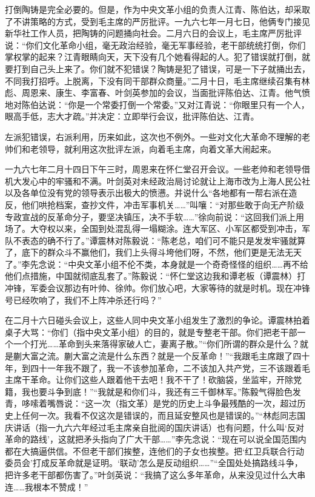 \begin{maonote}
打倒陶铸是完全必要的。但是，作为中央文革小组的负责人江青、陈伯达，却采取了不讲策略的方式，受到毛主席的严厉批评。一九六七年一月七日，他俩专门接见新华社工作人员，把陶铸的问题捅向社会。二月六日的会议上，毛主席严厉批评说：“你们文化革命小组，毫无政治经验，毫无军事经验，老干部统统打倒，你们掌权掌的起来？江青眼睛向天，天下没有几个她看得起的人。犯了错误就打倒，就要打到自己头上来了。你们就不犯错误？陶铸是犯了错误，可是一下子就捅出去，不同我打招呼。上脱离，下没有同干部群众商量。”二月十日，毛主席继续召集有林彪、周恩来、康生、李富春、叶剑英参加的会议，当面批评陈伯达、江青。他气愤地对陈伯达说：“你是一个常委打倒一个常委。”又对江青说：“你眼里只有一个人，眼高手低，志大才疏。”并决定：立即举行会议，批评陈伯达、江青。

左派犯错误，右派利用，历来如此，这次也不例外。一些对文化大革命不理解的老帅们和老领导，就利用这次批评左派，向着毛主席，向着文革大闹起来。

一九六七年二月十四日下午三时，周恩来在怀仁堂召开会议。一些老帅和老领导借机大发心中的牢骚和不满。叶剑英对未经政治局讨论就让上海市改为上海人民公社以及各单位没有党的领导表示出极大的愤懑。并说什么“各地都有一帮右派在造反，他们哄抢档案，查抄文件，冲击军事机关……”叫嚷：“对那些敢于向无产阶级专政宣战的反革命分子，要坚决镇压，决不手软……”徐向前说：“这回我们派上用场了。大夺权以来，全国到处混乱得一塌糊涂。连大军区、小军区都受到冲击，军队不表态的确不行了。”谭震林对陈毅说：“陈老总，咱们可不能只是发发牢骚就算了，底下的群众斗不赢他们，我们上头得斗垮他们呀，不然，他们更是无法无天了。”李先念说：“中央文革小组不伦不类，本身就是一个奇奇怪怪的组织……再不给他们点措施，中国就彻底乱套了。”陈毅说：“怀仁堂这边我和谭老板（谭震林）打冲锋，军委会议那边有叶帅、徐帅。你们放心吧，大家等待的就是时机。现在冲锋号已经吹响了，我们不上阵冲杀还行吗？”

在二月十六日碰头会议上，这些人同中央文革小组发生了激烈的争论。谭震林拍着桌子大骂：“你们（指中央文革小组）的目的，就是专整老干部。你们把老干部一个一个打光……革命到头来落得家破人亡，妻离子散。”“你们所谓的群众是什么？就是蒯大富之流。蒯大富之流是什么东西？就是一个反革命！”“我跟毛主席跟了四十年，到四十一年我不跟了，我一不该参加革命，二不该加入共产党，三不该跟着毛主席干革命。让你们这些人跟着他干去吧！我不干了！砍脑袋，坐监牢，开除党籍，我也要斗争到底！”“我就是和你们斗，我还有三千御林军。”陈毅气得脸色发青，哆嗦着嘴唇说：“这一次（指文革）是党的历史上斗争最残酷的一次，超过历史上任何一次。我看不仅这次是错误的，而且延安整风也是错误的。”“林彪同志国庆讲话（指一九六六年经过毛主席亲自批阅的国庆讲话）也有问题，什么叫‘反对革命的路线’，这就把矛头指向了广大干部……”李先念说：“现在可以说全国范围内都在大搞逼供信。不但老干部们挨整，连他们的子女也挨整。把‘红卫兵联合行动委员会’打成反革命就是证明。‘联动’怎么是反动组织……”“全国处处搞路线斗争，把许多老干部都伤害了。”叶剑英说：“我搞了这么多年革命，从来没见过什么大串连……我根本不赞成！”


\end{maonote}
